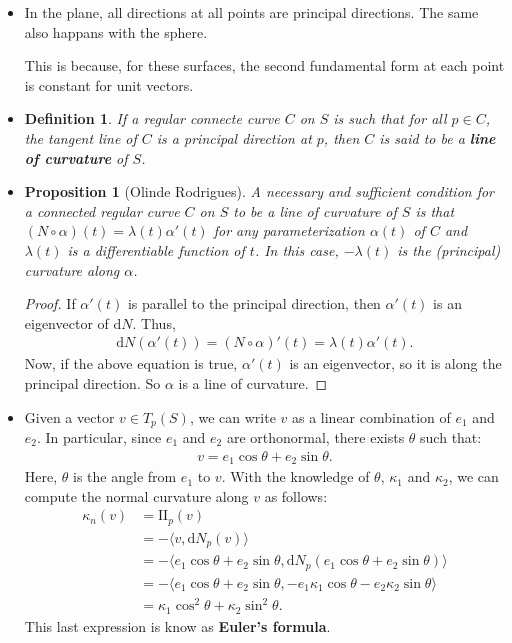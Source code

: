 \documentclass[10pt]{article}
\newtheorem{definition}[lemma]{Definition}
\newtheorem{proposition}[lemma]{Proposition}
\newcommand{\dee}{\mathrm{d}}
\newcommand{\II}{\mathrm{II}}
\begin{document}
\begin{itemize}
    \item In the plane, all directions at all points are principal directions. The same also happans with the sphere.

    This is because, for these surfaces, the second fundamental form at each point is constant for unit vectors.

    \item \begin{definition}
      If a regular connecte curve $C$ on $S$ is such that for all $p \in C$, the tangent line of $C$ is a principal direction at $p$, then $C$ is said to be a {\bf line of curvature} of $S$.
    \end{definition}

    \item \begin{proposition}[Olinde Rodrigues]
      A necessary and sufficient condition for a connected regular curve $C$ on $S$ to be a line of curvature of $S$ is that $(N\circ \alpha)(t) = \lambda(t) \alpha'(t)$ for any parameterization $\alpha(t)$ of $C$ and $\lambda(t)$ is a differentiable function of $t$. In this case, $-\lambda(t)$ is the (principal) curvature along $\alpha$.
    \end{proposition}
    \begin{proof}
      If $\alpha'(t)$ is parallel to the principal direction, then $\alpha'(t)$ is an eigenvector of $\dee N$. Thus,
      \begin{align*}
        \dee N(\alpha'(t)) = (N \circ \alpha)'(t) = \lambda(t)\alpha'(t).
      \end{align*}
      Now, if the above equation is true, $\alpha'(t)$ is an eigenvector, so it is along the principal direction. So $\alpha$ is a line of curvature.
    \end{proof}

    \item Given a vector $v \in T_p(S)$, we can write $v$ as a linear combination of $e_1$ and $e_2$. In particular, since $e_1$ and $e_2$ are orthonormal, there exists $\theta$ such that:
    \begin{align*}
      v = e_1 \cos \theta + e_2 \sin \theta.
    \end{align*}
    Here, $\theta$ is the angle from $e_1$ to $v$. With the knowledge of $\theta$, $\kappa_1$ and $\kappa_2$, we can compute the normal curvature along $v$ as follows:
    \begin{align*}
      \kappa_n(v) 
      &= \II_p(v)\\
      &= -\langle v, \dee N_p(v) \rangle\\
      &= -\langle e_1 \cos \theta + e_2 \sin\theta, \dee N_p(e_1 \cos \theta + e_2 \sin\theta) \rangle\\
      &= -\langle e_1 \cos \theta + e_2 \sin\theta, - e_1 \kappa_1 \cos \theta - e_2 \kappa_2 \sin\theta \rangle\\
      &= \kappa_1 \cos^2 \theta + \kappa_2 \sin^2 \theta.
    \end{align*}
    This last expression is know as {\bf Euler's formula}.


\end{itemize}
\end{document}
